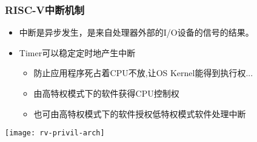 \begin{frame}
	\frametitle{RISC-V中断机制}
	\begin{itemize}
		\item 中断是异步发生，是来自处理器外部的I/O设备的信号的结果。
		
		
		\item Timer可以稳定定时地产生中断
		\begin{itemize}
			\item 防止应用程序死占着CPU不放,让OS Kernel能得到执行权...
			\item 由高特权模式下的软件获得CPU控制权
			\item 也可由高特权模式下的软件授权低特权模式软件处理中断
		\end{itemize}				
		
	\end{itemize}
	
	\centering
	\texttt{[image: rv-privil-arch]}
	
\end{frame}



